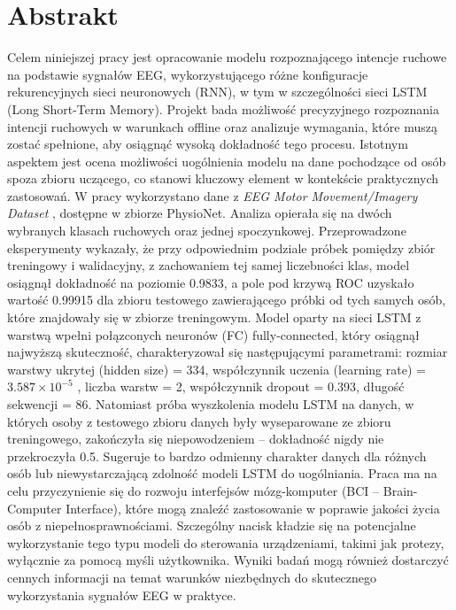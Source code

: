 \documentclass[eeg_v4.tex]{subfiles}
\begin{document}
    \section*{Abstrakt}
    Celem niniejszej pracy jest opracowanie modelu rozpoznającego intencje ruchowe na podstawie sygnałów EEG,
    wykorzystującego różne konfiguracje rekurencyjnych sieci neuronowych (RNN), w tym w szczególności sieci LSTM (Long
    Short-Term Memory). Projekt bada możliwość precyzyjnego rozpoznania intencji ruchowych w warunkach offline oraz
    analizuje wymagania, które muszą zostać spełnione, aby osiągnąć wysoką dokładność tego procesu. Istotnym aspektem
    jest ocena możliwości uogólnienia modelu na dane pochodzące od osób spoza zbioru uczącego, co stanowi kluczowy
    element w kontekście praktycznych zastosowań. W pracy wykorzystano dane z \emph{EEG Motor Movement/Imagery Dataset}
    \cite{goldberger2000}
    , dostępne w zbiorze PhysioNet. Analiza opierała się na dwóch wybranych klasach ruchowych oraz jednej spoczynkowej.
    Przeprowadzone
    eksperymenty wykazały, że przy odpowiednim podziale próbek pomiędzy zbiór treningowy i walidacyjny, z zachowaniem
    tej
    samej liczebności klas, model osiągnął dokładność na poziomie 0.9833, a pole pod krzywą ROC uzyskało wartość 0.99915
    dla zbioru testowego zawierającego próbki od tych samych osób, które znajdowały się w zbiorze treningowym. Model
    oparty na sieci LSTM z warstwą wpełni połązconych neuronów (FC) fully-connected,
    który osiągnął najwyższą skuteczność, charakteryzował się następującymi parametrami: rozmiar warstwy ukrytej (hidden
    size) = 334, współczynnik uczenia (learning rate) = $3.587 \times 10^{-5}$
    , liczba warstw = 2, współczynnik dropout = 0.393, długość sekwencji = 86. Natomiast próba wyszkolenia modelu LSTM
    na danych, w których osoby z testowego zbioru danych były wyseparowane ze zbioru treningowego, zakończyła się
    niepowodzeniem – dokładność nigdy nie przekroczyła 0.5. Sugeruje to bardzo odmienny charakter danych dla różnych
    osób lub niewystarczającą zdolność modeli LSTM do uogólniania. Praca ma na celu przyczynienie się do rozwoju
    interfejsów mózg-komputer (BCI – Brain-Computer Interface), które mogą znaleźć zastosowanie w poprawie jakości życia
    osób z niepełnosprawnościami. Szczególny nacisk kładzie się na potencjalne wykorzystanie tego typu modeli do
    sterowania urządzeniami, takimi jak protezy, wyłącznie za pomocą myśli użytkownika. Wyniki badań mogą również
    dostarczyć cennych informacji na temat warunków niezbędnych do skutecznego wykorzystania sygnałów EEG w praktyce.
\end{document}
